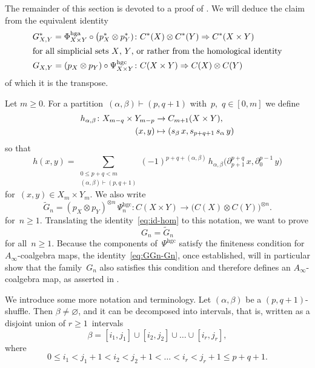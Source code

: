 \documentclass[letterpaper]{amsart}
\numberwithin{equation}{section}
\theoremstyle{plain}
\theoremstyle{definition}
\theoremstyle{remark}
\let\emptyset\varnothing
\def\Ainf{A_{\infty}}
\def\Phihga{\Phi^{\mathrm{hga}}}
\def\Psihgc{\Psi^{\mathrm{hgc}}}
\begin{document}
The remainder of this section is devoted to a proof of .
We will deduce the claim from the equivalent identity
\begin{align}
  \label{eq:id-cohom}
  G_{X,Y}^{*} = \Phihga_{X\times Y}\circ\bigl(p_{X}^{*}\otimes p_{Y}^{*}) \colon & C^{*}(X)\otimes C^{*}(Y) \Rightarrow C^{*}(X\times Y) \\
\shortintertext{for all simplicial sets~$X$,~$Y$, or rather from the homological identity}
  \label{eq:id-hom}
  G_{X,Y} = (p_{X}\otimes p_{Y})\circ \Psihgc_{X\times Y} \colon & C(X\times Y) \Rightarrow C(X)\otimes C(Y)
\end{align}
of which it is the transpose.

\def\GG{\tilde G}
\def\n{m}
Let $\n\ge0$. For a partition~$(\alpha,\beta)\vdash(p,q+1)$ with~$p$,~$q\in[0,\n]$ we define
\begin{align}
  \label{eq:def-psi}
  h_{\alpha,\beta}\colon X_{\n-q}\times Y_{\n-p} &\to C_{\n+1}(X\times Y), \\
  \notag
  (x,y) &\mapsto (s_{\beta}\,x, s_{p+q+1}\,s_{\alpha}\,y)
\end{align}
so that
\begin{equation}
  h(x,y) = \!\!\! \sum_{\substack{0\le p+q < \n\\(\alpha,\beta)\vdash(p,q+1)}} \!\!\! (-1)^{p+q+(\alpha,\beta)}\,
  h_{\alpha,\beta}\bigl(\partial_{p+1}^{p+q}\,x,\partial_{0}^{p-1}\,y\bigr)
\end{equation}
for~$(x,y)\in X_{\n}\times Y_{\n}$. We also write
\begin{equation}
  \GG_{n} = (p_{X}\otimes p_{Y})^{\otimes n}\,\Psihgc_{n}\colon C(X\times Y) \to \bigl(C(X)\otimes C(Y)\bigr)^{\otimes n}.
\end{equation}
for~$n\ge1$. Translating the identity~\eqref{eq:id-hom} to this notation, we want to prove
\begin{equation}
  \label{eq:GGn-Gn}
  G_{n} = \GG_{n}
\end{equation}
for all~$n\ge1$.
Because the components of~$\Psihgc$ satisfy the finiteness condition for $\Ainf$-coalgebra maps,
the identity~\eqref{eq:GGn-Gn}, once established, will in particular show that the family~$G_{n}$ also satisfies this condition
and therefore defines an $\Ainf$-coalgebra map, as asserted in .

We introduce some more notation and terminology. Let $(\alpha,\beta)$ be a $(p,q+1)$-shuffle.
Then $\beta\ne\emptyset$, and it can be decomposed into intervals,
that is, written as a disjoint union of $r\ge1$~intervals
\begin{equation}
  \beta = [i_{1},j_{1}]\cup[i_{2},j_{2}]\cup\dots\cup[i_{r},j_{r}],
\end{equation}
where
\begin{equation}
  0 \le i_{1} < j_{1}+1 < i_{2} < j_{2}+1 < \dots < i_{r} < j_{r}+1 \le p+q+1.
\end{equation}
\end{document}
